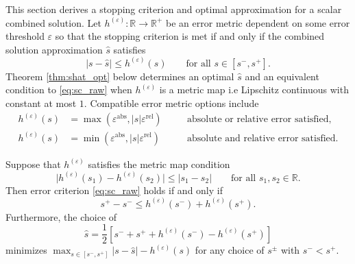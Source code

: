\documentclass[graybox]{svmult}
\begin{document}
This section derives a stopping criterion and optimal approximation for a scalar combined solution. Let $h^{(\varepsilon)}: \mathbb{R} \to \mathbb{R}^+$ be an error metric dependent on some error threshold $\varepsilon$ so that the stopping criterion is met if and only if the combined solution approximation $\hat{s}$ satisfies 
\begin{equation}
    \lvert s-\hat{s} \rvert \leq h^{(\varepsilon)}(s) \qquad \text{for all } s \in [s^-,s^+].
    \label{eq:sc_raw}
\end{equation}
Theorem \ref{thm:shat_opt} below determines an optimal $\hat{s}$ and an equivalent condition to \eqref{eq:sc_raw} when $h^{(\varepsilon)}$ is a metric map i.e Lipschitz continuous with constant at most $1$. Compatible error metric options include
\begin{subequations}
\begin{align}
    h^{(\varepsilon)}(s) &= \max\left(\varepsilon^\text{abs},\lvert s \rvert \varepsilon^\text{rel} \right) \quad &&\text{absolute or relative error satisfied,} \label{eq:h_abs_or_rel} \\
    h^{(\varepsilon)}(s) &= \min\left(\varepsilon^\text{abs},\lvert s \rvert \varepsilon^\text{rel} \right) \quad &&\text{absolute and relative error satisfied.} \label{eq:h_abs_and_rel}
\end{align}
\end{subequations}
\begin{theorem} \label{thm:shat_opt}
    Suppose that  $h^{(\varepsilon)}$ satisfies the metric map condition
    \begin{equation}
        \lvert h^{(\varepsilon)}(s_1) - h^{(\varepsilon)}(s_2) \rvert \leq \lvert s_1 - s_2 \rvert \qquad \text{for all } s_1,s_2 \in \mathbb{R}.
        \label{eq:metric_map_cond}
    \end{equation}
    Then error criterion  \eqref{eq:sc_raw} holds if and only if 
    \begin{equation}
        s^+-s^- \leq h^{(\varepsilon)}(s^-)+h^{(\varepsilon)}(s^+).
        \label{eq:sc}
    \end{equation}
    Furthermore, the choice of 
    \begin{equation}
        \hat{s} = \frac{1}{2}\left[s^-+s^++h^{(\varepsilon)}(s^-)-h^{(\varepsilon)}(s^+)\right]
        \label{eq:shat_opt}
    \end{equation}
    minimizes $\max_{s \in [s^-,s^+]} \lvert s - \hat{s} \rvert -h^{(\varepsilon)}(s)$ for any choice of $s^{\pm}$ with $s^- < s^+$.
\end{theorem}
\end{document}
